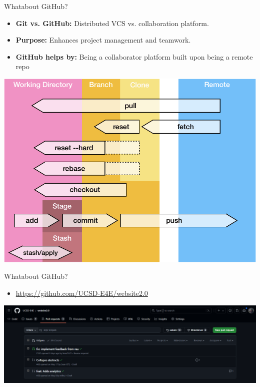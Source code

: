 \documentclass[aspectratio=169]{beamer}
\begin{document}
\begin{frame}{Whatabout GitHub?}
    \begin{itemize}
        \item \textbf{Git vs. GitHub:} Distributed VCS vs. collaboration platform.
        \item \textbf{Purpose:} Enhances project management and teamwork.
        \item \textbf{GitHub helps by:} Being a collaborator platform built upon being a remote repo
    \end{itemize}
    \begin{center}
        \includegraphics[scale=.25]{git_commands.png}
    \end{center}
\end{frame}

\begin{frame}{Whatabout GitHub?}
    \begin{itemize}
        \item \href{https://github.com/UCSD-E4E/website2.0}{https://github.com/UCSD-E4E/website2.0}
    \end{itemize}
    \begin{center}
        \includegraphics[scale=.35]{github.png}
    \end{center}
\end{frame}
\end{document}
